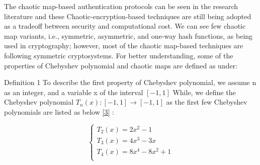 \documentclass[preprint]{oscmjournal}
\begin{document}
The chaotic map-based authentication protocols can be seen in the research literature and these Chaotic-encryption-based techniques are still being adopted as a tradeoff between security and computational cost. We can see few chaotic map variants, i.e., symmetric, asymmetric, and one-way hash functions, as being used in cryptography; however, most of the chaotic map-based techniques are following symmetric cryptosystems. For better understanding, some of the properties of Chebyshev polynomial and chaotic maps are defined as under:

Definition 1 To describe the first property of Chebyshev polynomial, we assume n as an integer, and a variable x of the interval $[−1, 1]$ While, we define the Chebyshev polynomial \(T_{n}(x): [−1, 1] \longrightarrow  [−1, 1]\) as the first few Chebyshev polynomials are listed as below \href{3}{[3]} :
\centering

   \[\left\{
   \begin{aligned}
   T_2(x) = 2x^2 - 1 \\
   T_3(x) = 4x^3 - 3x \\         \label{3}
   T_4(x) = 8x^4 -8x^2 + 1 \\
   \end{aligned}\right.
   \]
\end{document}
